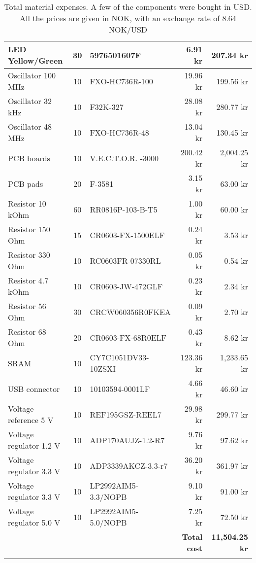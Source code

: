 \begin{longtable}{|p{3cm}|c|p{4.3cm}|r|r|}
    LED Yellow/Green        & 30    & 5976501607F               & 6.91 kr    & 207.34 kr   \\ \hline
    Oscillator 100 MHz      & 10    & FXO-HC736R-100	        & 19.96 kr   & 199.56 kr   \\ \hline
    Oscillator 32 kHz       & 10    & F32K-327	                & 28.08 kr   & 280.77 kr   \\ \hline
    Oscillator 48 MHz       & 10    & FXO-HC736R-48	            & 13.04 kr   & 130.45 kr   \\ \hline
    PCB boards              & 10    & V.E.C.T.O.R. -3000        & 200.42 kr  & 2,004.25 kr \\ \hline
    PCB pads                & 20    & F-3581                    & 3.15 kr    & 63.00 kr    \\ \hline
    Resistor 10 kOhm        & 60    & RR0816P-103-B-T5	        & 1.00 kr    & 60.00 kr    \\ \hline
    Resistor 150 Ohm        & 15    & CR0603-FX-1500ELF	        & 0.24 kr    & 3.53 kr     \\ \hline
    Resistor 330 Ohm        & 10    & RC0603FR-07330RL	        & 0.05 kr    & 0.54 kr     \\ \hline
    Resistor 4.7 kOhm       & 10    & CR0603-JW-472GLF	        & 0.23 kr    & 2.34 kr     \\ \hline
    Resistor 56 Ohm         & 30    & CRCW060356R0FKEA	        & 0.09 kr    & 2.70 kr     \\ \hline
    Resistor 68 Ohm         & 20    & CR0603-FX-68R0ELF	        & 0.43 kr    & 8.62 kr     \\ \hline
    SRAM                    & 10    & CY7C1051DV33-10ZSXI	    & 123.36 kr  & 1,233.65 kr \\ \hline
    USB connector           & 10    & 10103594-0001LF	        & 4.66 kr    & 46.60 kr    \\ \hline
    Voltage reference 5 V   & 10    & REF195GSZ-REEL7	        & 29.98 kr   & 299.77 kr   \\ \hline
    Voltage regulator 1.2 V & 10    & ADP170AUJZ-1.2-R7	        & 9.76 kr    & 97.62 kr    \\ \hline
    Voltage regulator 3.3 V & 10    & ADP3339AKCZ-3.3-r7	    & 36.20 kr   & 361.97 kr   \\ \hline
    Voltage regulator 3.3 V & 10    & LP2992AIM5-3.3/NOPB	    & 9.10 kr    & 91.00 kr    \\ \hline
    Voltage regulator 5.0 V & 10    & LP2992AIM5-5.0/NOPB	    & 7.25 kr    & 72.50 kr    \\ \hline \hline
    ~                       & ~     & ~   & \textbf{Total cost} & \textbf{11,504.25 kr}	   \\ \hline \hline
\caption{Total material expenses. A few of the components were bought in USD. All the prices are given in NOK, with an exchange rate of 8.64 NOK/USD}
\end{longtable}
